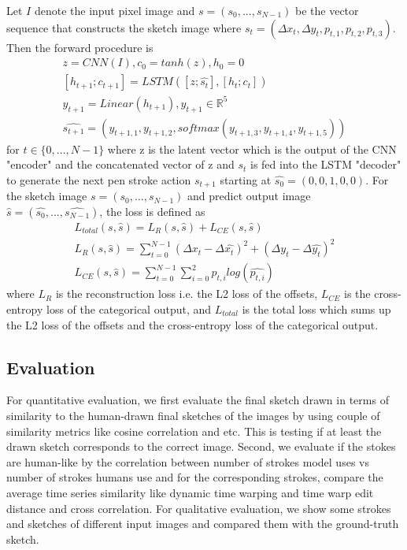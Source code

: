 \documentclass{article}
\begin{document}
Let $I$ denote the input pixel image and $s = (s_{0}, ..., s_{N-1})$ be the vector sequence that constructs the sketch image where $s_{t} = (\Delta x_{t}, \Delta y_{t}, p_{t, 1}, p_{t, 2}, p_{t, 3})$. Then the forward procedure is
\begin{gather}
z = CNN(I), c_{0} = tanh(z), h_{0} = 0\\
[h_{t+1}; c_{t+1}] = LSTM([z;\hat{s_{t}}], [h_{t}; c_{t}])\\
y_{t+1} = Linear(h_{t+1}), y_{t+1}\in\mathbb{R}^{5}\\
\hat{s_{t+1}} = (y_{t+1,1}, y_{t+1,2}, softmax(y_{t+1,3}, y_{t+1,4}, y_{t+1,5}))
\end{gather}
for $t\in \{0, ..., N-1\}$ where z is the latent vector which is the output of the CNN "encoder" and the concatenated vector of z and $s_{t}$ is fed into the LSTM "decoder" to generate the next pen stroke action $s_{t+1}$ starting at $\hat{s_{0}} = (0,0,1,0,0)$. For the sketch image $s = (s_{0}, ..., s_{N-1})$ and predict output image $\hat{s} = (\hat{s_{0}}, ..., \hat{s_{N-1}})$, the loss is defined as
\begin{gather}
L_{total}(s, \hat{s}) = L_{R}(s, \hat{s}) + L_{CE}(s, \hat{s})\\
L_{R}(s, \hat{s}) = \sum_{t=0}^{N-1} (\Delta x_{t} - \Delta \hat{x_{t}})^{2} + (\Delta y_{t} - \Delta \hat{y_{t}})^{2}\\
L_{CE}(s, \hat{s}) = \sum_{t=0}^{N-1} \sum_{i=0}^{2} p_{t,i} log(\hat{p_{t,i}})
\end{gather}
where $L_{R}$ is the reconstruction loss i.e. the L2 loss of the offsets, $L_{CE}$ is the cross-entropy loss of the categorical output, and $L_{total}$ is the total loss which sums up the L2 loss of the offsets and the cross-entropy loss of the categorical output.

\subsection{Evaluation}
For quantitative evaluation, we first evaluate the final sketch drawn in terms of similarity to the human-drawn final sketches of the images by using couple of similarity metrics like cosine correlation and etc. This is testing if at least the drawn sketch corresponds to the correct image. Second, we evaluate if the stokes are human-like by the correlation between number of strokes model uses vs number of strokes humans use and for the corresponding strokes, compare the average time series similarity like dynamic time warping and time warp edit distance and cross correlation. For qualitative evaluation, we show some strokes and sketches of different input images and compared them with the ground-truth sketch.
\end{document}

